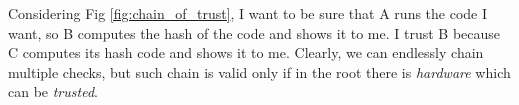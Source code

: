 Considering Fig \ref{fig:chain_of_trust}, I want to be sure that A runs the code I want, so
B computes the hash of the code and shows it to me.
I trust B because C computes its hash code and shows it to me.
Clearly, we can endlessly chain multiple checks,
but such chain is valid only if in the root there is \textit{hardware} which can be \textit{trusted}.